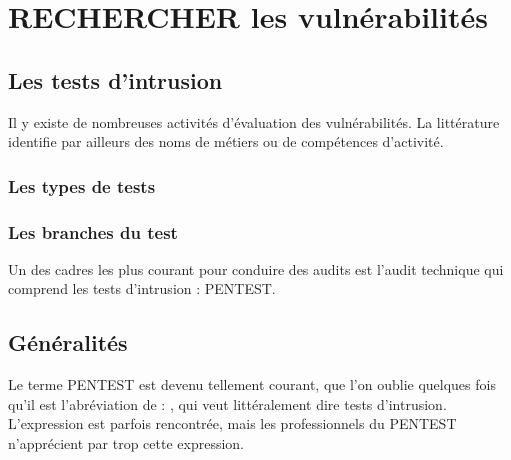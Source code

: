 \uchap{\jobname}


\section{RECHERCHER les vulnérabilités}

\subsection{Les tests d'intrusion}

Il y existe de nombreuses activités d'évaluation des vulnérabilités. La littérature identifie par ailleurs des noms de métiers ou de compétences d'activité.

\begin{frame}
\frametitle<presentation>{Les types de tests}
\end{frame}


\begin{frame}
\frametitle<presentation>{Les branches du test}
\end{frame}



Un des cadres les plus courant pour conduire des audits est l'audit technique qui comprend les tests d'intrusion : PENTEST.

\subsection{Généralités}

Le terme PENTEST est devenu tellement courant, que l'on oublie quelques fois qu'il est l'abréviation de : , qui  veut littéralement dire tests d'intrusion.  L'expression   est parfois rencontrée, mais les professionnels du PENTEST n'apprécient par trop cette expression. 

